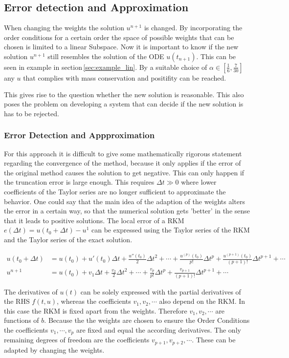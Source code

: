 \documentclass[a4paper]{scrartcl}
\numberwithin{equation}{section}
\theoremstyle{plain}
\theoremstyle{definition}
\numberwithin{theorem}{section}
\newcommand{\dt}{{\Delta t}}
\newcommand{\1}{\mathbbm{1}}
\begin{document}
\subsection{Error detection and Approximation}
When changing the weights the solution $u^{n+1}$ is changed. 
By incorporating the order conditions for a certain order the space of possible weights that can be chosen is limited to a linear Subspace. 
Now it is important to know if the new solution $u^{n+1}$ still resembles the solution of the ODE $u(t_{n+1})$. 
This can be seen in example in section\,\ref{sec:example_lin}.
By a suitable choice of $\alpha \in [\frac{1}{6},\frac{7}{30}]$ any $u$ that complies with mass conservation and positifity can be reached. 

This gives rise to the question whether the new solution is reasonable.
This also poses the problem on developing a system that can decide if the new solution is has to be rejected. 
 
\subsubsection{Error Detection and Appproximation}
For this approach it is difficult to give some mathematically rigorous statement regarding the convergence of the method, because it only applies if the error of the original method causes the solution to get negative. This can only happen if the truncation error is large enough. This requires $\dt \gg 0$ where lower coefficients of the Taylor series are no longer sufficient to approximate the behavior. 
One could say that the main idea of the adaption of the weights alters the error in a certain way, so that the numerical solution gets 'better' in the sense that it leads to positive solutions. 
The local error of a RKM $e(\dt) =u(t_0 + \dt) - u^1$ can be expressed using the Taylor series of the RKM and the Taylor series of the exact solution. %

\begin{align}\label{eq:Taylor_sol_ref}
u(t_0 + \dt) &= u(t_0) + u'(t_0) \dt + \frac{u''(t_0)}{2} \dt^2 + \cdots + \frac{u^{(p)}(t_0)}{p!} \dt^p + \frac{u^{(p+1)}(t_0)}{(p+1)!} \dt^{p+1} + \cdots \\
u^{n+1} &= u(t_0)  + v_1 \dt + \frac{v_2}{2} \dt^2 + \cdots + \frac{v_p}{p!} \dt^p + \frac{v_{p+1}}{(p+1)!} \dt^{p+1} + \cdots 
\end{align}

The derivatives of $u(t)$ can be solely expressed with the partial derivatives of the RHS $f(t,u)$, whereas the coefficients $v_1,v_2,\cdots$ also depend on the RKM. 
In this case the RKM is fixed apart from the weights. 
Therefore $v_1,v_2,\cdots$ are functions of $b$.
Because the the weights are chosen to ensure the Order Conditions the coefficients $v_1,\cdots,v_p$ are fixed and equal the according derivatives. 
The only remaining degrees of freedom are the coefficients $v_{p+1},v_{p+2},\cdots$.
These can be adapted by changing the weights.
\end{document}
